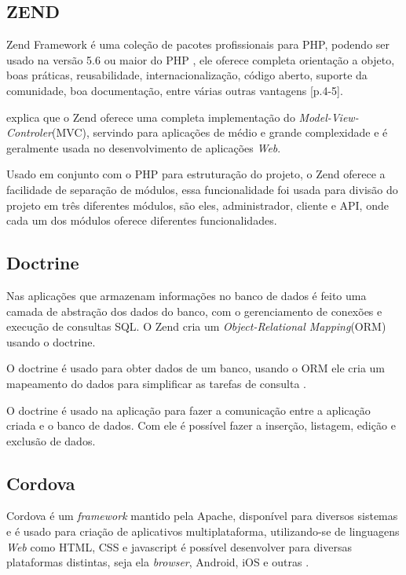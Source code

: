 \subsection{ZEND}
Zend Framework é uma coleção de pacotes profissionais para PHP, podendo ser usado na versão 5.6 ou maior do PHP \cite{zend2018}, ele oferece completa orientação a objeto, boas práticas, reusabilidade, internacionalização, código aberto, suporte da comunidade, boa documentação, entre várias outras vantagens \cite{vaswani2010}[p.4-5].

\cite[p.3]{vaswani2010} explica que o Zend oferece uma completa implementação do \textit{Model-View-Controler}(MVC), servindo para aplicações de médio e grande complexidade e é geralmente usada no desenvolvimento de aplicações \textit{Web}.

Usado em conjunto com o PHP para estruturação do projeto, o Zend oferece a facilidade de separação de módulos, essa funcionalidade foi usada para divisão do projeto em três diferentes módulos, são eles, administrador, cliente e API, onde cada um dos módulos oferece diferentes funcionalidades.

\subsection{Doctrine}
Nas aplicações que armazenam informações no banco de dados é feito uma camada de abstração dos dados do banco, com o gerenciamento de conexões e execução de consultas SQL. O Zend cria um \textit{Object-Relational Mapping}(ORM) usando o doctrine.

O doctrine é usado para obter dados de um banco, usando o ORM ele cria um mapeamento do dados para simplificar as tarefas de consulta \cite[p.102]{vaswani2010}.

O doctrine é usado na aplicação para fazer a comunicação entre a aplicação criada e o banco de dados. Com ele é possível fazer a inserção, listagem, edição e exclusão de dados.

\subsection{Cordova}
Cordova é um \textit{framework} mantido pela Apache, disponível para diversos sistemas e é usado para criação de aplicativos multiplataforma, utilizando-se de linguagens \textit{Web} como HTML, CSS e javascript é possível desenvolver para diversas plataformas distintas, seja ela \textit{browser}, Android, iOS e outras \cite{prezotto2017}.

